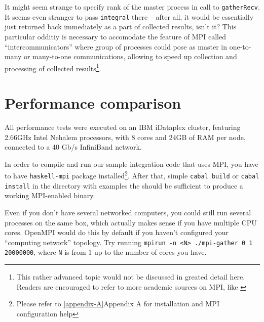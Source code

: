 \documentclass{tmr}
\begin{document}
It might seem strange to specify rank of the master process in call to
\verb|gatherRecv|. It seems even stranger to pass \verb|integral|
there -- after all, it would be essentially just returned back
immediately as a part of collected results, isn't it? This particular
odditiy is necessary to accomodate the feature of MPI called
``intercommunicators'' where group of processes could pose as master
in one-to-many or many-to-one communications, allowing to speed up
collection and processing of collected results\footnote{This rather
  advanced topic would not be discussed in greated detail here.
  Readers are encouraged to refer to more academic sources on MPI,
  like \cite{mpi-report}}.

\section{Performance comparison}

All performance tests were executed on an IBM iDataplex cluster, featuring 2.66GHz Intel Nehalem processors, with 8 cores and
24GB of RAM per node, connected to a 40 Gb/s InfiniBand network.

In order to compile and run our sample integration code that uses MPI, you have to
have \verb|haskell-mpi| package installed\footnote{Please refer to
  \ref{appendix-A}{Appendix A} for installation and MPI configuration help}. After that,
simple \verb|cabal build| or \verb|cabal install| in the directory
with examples the should be sufficient to produce a working MPI-enabled binary.

Even if you don't have several networked computers, you could still
run several processes on the same box, which actually makes sense if
you have multiple CPU cores. OpenMPI would do this by default if you
haven't configured your ``computing network'' topology. Try running
\verb|mpirun -n <N> ./mpi-gather 0 1 20000000|, where \verb|N| is
from 1 up to the number of cores you have.

\end{document}
